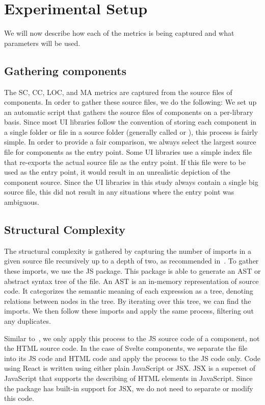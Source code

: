 \chapter{Experimental Setup}\label{chap:experimental-setup}
We will now describe how each of the metrics is being captured and what parameters will be used.

\section{Gathering components}\label{sec:experimental-setup:gathering-components}
The SC, CC, LOC, and MA metrics are captured from the source files of components. In order to gather these source files, we do the following: We set up an automatic script that gathers the source files of components on a per-library basis. Since most UI libraries follow the convention of storing each component in a single folder or file in a source folder (generally called  or ), this process is fairly simple. In order to provide a fair comparison, we always select the largest source file for components as the entry point. Some UI libraries use a simple index file that re-exports the actual source file as the entry point. If this file were to be used as the entry point, it would result in an unrealistic depiction of the component source. Since the UI libraries in this study always contain a single big source file, this did not result in any situations where the entry point was ambiguous.

\section{Structural Complexity}
The structural complexity is gathered by capturing the number of imports in a given source file recursively up to a depth of two, as recommended in~\cite{martinez-ortiz2016quality}. To gather these imports, we use the  JS package. This package is able to generate an AST or abstract syntax tree of the file. An AST is an in-memory representation of source code. It categorizes the semantic meaning of each expression as a tree, denoting relations between nodes in the tree. By iterating over this tree, we can find the imports. We then follow these imports and apply the same process, filtering out any duplicates.

Similar to~\cite{martinez-ortiz2016quality}, we only apply this process to the JS source code of a component, not the HTML source code. In the case of Svelte components, we separate the file into its JS code and HTML code and apply the process to the JS code only. Code using React is written using either plain JavaScript or JSX. JSX is a superset of JavaScript that supports the describing of HTML elements in JavaScript. Since the  package has built-in support for JSX, we do not need to separate or modify this code.

